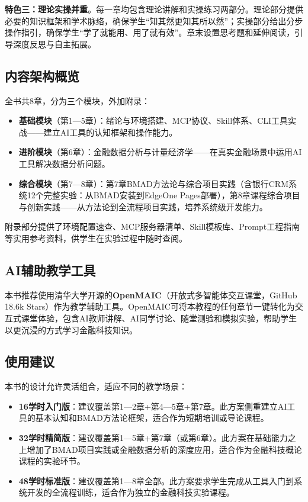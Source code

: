 \textbf{特色三：理论实操并重}。每一章均包含理论讲解和实操练习两部分。理论部分提供必要的知识框架和学术脉络，确保学生``知其然更知其所以然''；实操部分给出分步操作指引，确保学生``学了就能用、用了就有效''。章末设置思考题和延伸阅读，引导深度反思与自主拓展。

\subsection*{内容架构概览}

全书共8章，分为三个模块，外加附录：

\begin{itemize}[leftmargin=2em]
  \item \textbf{基础模块}（第1—5章）：绪论与环境搭建、MCP协议、Skill体系、CLI工具实战——建立AI工具的认知框架和操作能力。
  \item \textbf{进阶模块}（第6章）：金融数据分析与计量经济学——在真实金融场景中运用AI工具解决数据分析问题。
  \item \textbf{综合模块}（第7—8章）：第7章BMAD方法论与综合项目实践（含银行CRM系统12个完整实验：从BMAD安装到EdgeOne Pages部署），第8章课程综合项目与创新实践——从方法论到全流程项目实践，培养系统级开发能力。
\end{itemize}

附录部分提供了环境配置速查、MCP服务器清单、Skill模板库、Prompt工程指南等实用参考资料，供学生在实验过程中随时查阅。

\subsection*{AI辅助教学工具}

本书推荐使用清华大学开源的\textbf{OpenMAIC}（开放式多智能体交互课堂，GitHub 18.6k Stars）作为教学辅助工具。OpenMAIC可将本教程的任何章节一键转化为交互式课堂体验，包含AI教师讲解、AI同学讨论、随堂测验和模拟实验，帮助学生以更沉浸的方式学习金融科技知识。

\subsection*{使用建议}

本书的设计允许灵活组合，适应不同的教学场景：

\begin{itemize}[leftmargin=2em]
  \item \textbf{16学时入门版}：建议覆盖第1—2章+第4—5章+第7章。此方案侧重建立AI工具的基本认知和BMAD方法论框架，适合作为短期培训或导论课程。
  \item \textbf{32学时精简版}：建议覆盖第1—5章+第7章（或第6章）。此方案在基础能力之上增加了BMAD项目实践或金融数据分析的深度应用，适合作为金融科技概论课程的实验环节。
  \item \textbf{48学时标准版}：建议覆盖第1—8章全部。此方案要求学生完成从工具入门到系统开发的全流程训练，适合作为独立的金融科技实验课程。
\end{itemize}

